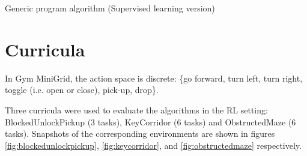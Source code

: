 \documentclass{article}
\begin{document}
\begin{center}
\begin{algorithm}[H]
\label{algo:sl}
\caption{Generic program algorithm (Supervised learning version)}

\end{algorithm}
\end{center}

\section{Curricula}\label{app:curricula}

In Gym MiniGrid, the action space is discrete: \{go forward, turn left, turn right, toggle (i.e. open or close), pick-up, drop\}.

Three curricula were used to evaluate the algorithms in the RL setting: BlockedUnlockPickup (3 tasks), KeyCorridor (6 tasks) and ObstructedMaze (6 tasks). Snapshots of the corresponding environments are shown in figures \ref{fig:blockedunlockpickup}, \ref{fig:keycorridor}, and \ref{fig:obstructedmaze} respectively.
\end{document}
